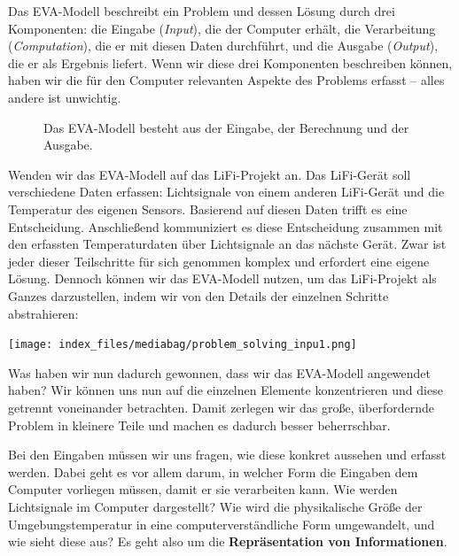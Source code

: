 \documentclass[
  letterpaper,
  DIV=11]{scrreprt}
\begin{document}
Das EVA-Modell beschreibt ein Problem und dessen Lösung durch drei
Komponenten: die Eingabe (\emph{Input}), die der Computer erhält, die
Verarbeitung (\emph{Computation}), die er mit diesen Daten durchführt,
und die Ausgabe (\emph{Output}), die er als Ergebnis liefert. Wenn wir
diese drei Komponenten beschreiben können, haben wir die für den
Computer relevanten Aspekte des Problems erfasst -- alles andere ist
unwichtig.

\begin{figure}


\caption{\label{fig-input-computation-output}Das EVA-Modell besteht aus
der Eingabe, der Berechnung und der Ausgabe.}

\end{figure}%

Wenden wir das EVA-Modell auf das LiFi-Projekt an. Das LiFi-Gerät soll
verschiedene Daten erfassen: Lichtsignale von einem anderen LiFi-Gerät
und die Temperatur des eigenen Sensors. Basierend auf diesen Daten
trifft es eine Entscheidung. Anschließend kommuniziert es diese
Entscheidung zusammen mit den erfassten Temperaturdaten über
Lichtsignale an das nächste Gerät. Zwar ist jeder dieser Teilschritte
für sich genommen komplex und erfordert eine eigene Lösung. Dennoch
können wir das EVA-Modell nutzen, um das LiFi-Projekt als Ganzes
darzustellen, indem wir von den Details der einzelnen Schritte
abstrahieren:

\begin{center}
\texttt{[image: index\_files/mediabag/problem\_solving\_inpu1.png]}
\end{center}

Was haben wir nun dadurch gewonnen, dass wir das EVA-Modell angewendet
haben? Wir können uns nun auf die einzelnen Elemente konzentrieren und
diese getrennt voneinander betrachten. Damit zerlegen wir das große,
überfordernde Problem in kleinere Teile und machen es dadurch besser
beherrschbar.

Bei den Eingaben müssen wir uns fragen, wie diese konkret aussehen und
erfasst werden. Dabei geht es vor allem darum, in welcher Form die
Eingaben dem Computer vorliegen müssen, damit er sie verarbeiten kann.
Wie werden Lichtsignale im Computer dargestellt? Wie wird die
physikalische Größe der Umgebungstemperatur in eine
computerverständliche Form umgewandelt, und wie sieht diese aus? Es geht
also um die \textbf{Repräsentation von Informationen}.
\end{document}
